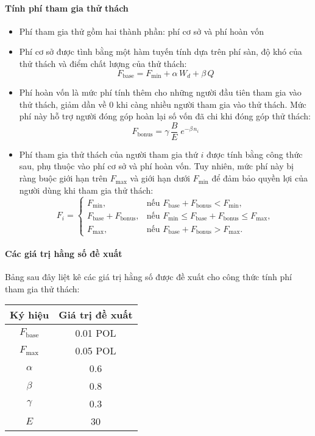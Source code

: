 \paragraph{Tính phí tham gia thử thách}
\begin{itemize}
  \item Phí tham gia thử gồm hai thành phần: phí cơ sở và phí hoàn vốn
  \item Phí cơ sở được tình bằng một hàm tuyến tính dựa trên phí sàn, độ khó của thử thách và điểm chất lượng của thử thách: 
    \[F_{\text{base}}= F_{\min}+ \alpha\,W_d + \beta\,Q\]
  \item Phí hoàn vốn là mức phí tính thêm cho những người đầu tiên tham gia vào thử thách, giảm dần về 0 khi càng nhiều người tham gia vào thử thách. Mức phí này hỗ trợ người đóng góp hoàn lại số vốn đã chi khi đóng góp thử thách: 
    \[F_{\mathrm{bonus}}= \gamma\,\frac{B}E\;e^{-\beta\,n_i}\]
  \item Phí tham gia thử thách của người tham gia thứ $i$ được tính bằng công thức sau, phụ thuộc vào phí cơ sở và phí hoàn vốn. Tuy nhiên, mức phí này bị ràng buộc giới hạn trên $F_{\max}$ và giới hạn dưới $F_{\min}$ để đảm bảo quyền lợi của người dùng khi tham gia thử thách:
    \[F_{i} =
    \begin{cases}
      F_{\min}, 
      & \text{nếu } F_{\mathrm{base}} + F_{\mathrm{bonus}} < F_{\min}, \\[6pt]
      F_{\mathrm{base}} + F_{\mathrm{bonus}}, 
      & \text{nếu } F_{\min} \le F_{\mathrm{base}} + F_{\mathrm{bonus}} \le F_{\max}, \\[6pt]
      F_{\max}, 
      & \text{nếu } F_{\mathrm{base}} + F_{\mathrm{bonus}} > F_{\max}.
    \end{cases}
    \] 
\end{itemize}

\paragraph{Các giá trị hằng số đề xuất} 

Bảng sau đây liệt kê các giá trị hằng số được đề xuất cho công thức tính phí tham gia thử thách:

\begin{table}[H]
\centering
  \begin{tabular}{|c|c|}
  \hline
  \textbf{Ký hiệu} & \textbf{Giá trị đề xuất} \\
  \hline 
  $F_{\text{base}}$ & 0.01 POL \\
  \hline
  $F_{\max}$ & 0.05 POL \\
  \hline
  $\alpha$ & 0.6 \\
  \hline
  $\beta$ & 0.8 \\
  \hline
  $\gamma$ & 0.3 \\
  \hline
  $E$ & 30 \\
  \hline
  \end{tabular}
\end{table}

